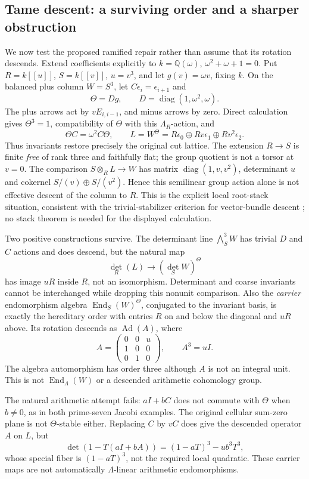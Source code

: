 \documentclass[11pt]{article}
\theoremstyle{definition}\newtheorem{definition}[theorem]{Definition}
\theoremstyle{remark}\newtheorem{remark}[theorem]{Remark}
\begin{document}
\subsection{Tame descent: a surviving order and a sharper obstruction}
We now test the proposed ramified repair rather than assume that its rotation descends. Extend coefficients explicitly to $k=\mathbb Q(\omega)$, $\omega^2+\omega+1=0$. Put $R=k[[u]]$, $S=k[[v]]$, $u=v^3$, and let $g(v)=\omega v$, fixing $k$. On the balanced plus column $W=S^3$, let $C\epsilon_i=\epsilon_{i+1}$ and
\[
 \Theta=Dg,\qquad D=\operatorname{diag}(1,\omega^2,\omega).
\]
The plus arrows act by $vE_{i,i-1}$, and minus arrows by zero. Direct calculation gives $\Theta^3=1$, compatibility of $\Theta$ with this $\Lambda_R$-action, and
\[
 \Theta C=\omega^2C\Theta,\qquad
 L=W^\Theta=R\epsilon_0\oplus Rv\epsilon_1\oplus Rv^2\epsilon_2.
\]
Thus invariants restore precisely the original cut lattice. The extension $R\to S$ is finite \emph{free} of rank three and faithfully flat; the group quotient is not a torsor at $v=0$. The comparison $S\otimes_R L\to W$ has matrix $\operatorname{diag}(1,v,v^2)$, determinant $u$ and cokernel $S/(v)\oplus S/(v^2)$. Hence this semilinear group action alone is not effective descent of the column to $R$. This is the explicit local root-stack situation, consistent with the trivial-stabilizer criterion for vector-bundle descent \cite[Theorem10.3]{AlperDescent}; no stack theorem is needed for the displayed calculation.

Two positive constructions survive. The determinant line $\bigwedge_S^3W$ has trivial $D$ and $C$ actions and does descend, but the natural map
\[
 \det_R(L)\longrightarrow(\det_S W)^\Theta
\]
has image $uR$ inside $R$, not an isomorphism. Determinant and coarse invariants cannot be interchanged while dropping this nonunit comparison. Also the \emph{carrier} endomorphism algebra $\operatorname{End}_S(W)^\Theta$, conjugated to the invariant basis, is exactly the hereditary order with entries $R$ on and below the diagonal and $uR$ above. Its rotation descends as $\operatorname{Ad}(A)$, where
\[
 A=\begin{pmatrix}0&0&u\\1&0&0\\0&1&0\end{pmatrix},\qquad A^3=uI.
\]
The algebra automorphism has order three although $A$ is not an integral unit. This is not $\operatorname{End}_\Lambda(W)$ or a descended arithmetic cohomology group.

The natural arithmetic attempt fails: $aI+bC$ does not commute with $\Theta$ when $b\ne0$, as in both prime-seven Jacobi examples. The original cellular sum-zero plane is not $\Theta$-stable either. Replacing $C$ by $vC$ does give the descended operator $A$ on $L$, but
\[
 \det(1-T(aI+bA))=(1-aT)^3-ub^3T^3,
\]
whose special fiber is $(1-aT)^3$, not the required local quadratic. These carrier maps are not automatically $\Lambda$-linear arithmetic endomorphisms.
\end{document}
